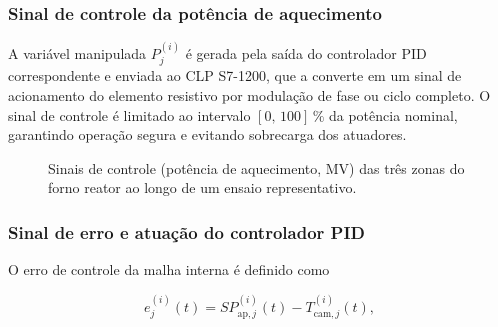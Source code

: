 \subsubsection{Sinal de controle da potência de aquecimento}
\label{sec:sinal_mv}

A variável manipulada $P^{(i)}_j$ é gerada pela saída do controlador PID
correspondente e enviada ao CLP S7-1200, que a converte em um sinal de
acionamento do elemento resistivo por modulação de fase ou ciclo completo.
O sinal de controle é limitado ao intervalo $[0,\,100]\,\%$ da potência
nominal, garantindo operação segura e evitando sobrecarga dos atuadores.


\begin{figure}[ht]
\begin{center}
\caption{Sinais de controle (potência de aquecimento, MV) das três zonas
do forno reator ao longo de um ensaio representativo.}
\label{fig:sinais_mv}
\end{center}
\end{figure}

\subsubsection{Sinal de erro e atuação do controlador PID}
\label{sec:sinal_erro}

O erro de controle da malha interna é definido como

\begin{equation}
  e^{(i)}_j(t) = SP^{(i)}_{\mathrm{ap},j}(t) - T^{(i)}_{\mathrm{cam},j}(t),
  \label{eq:erro_malha}
\end{equation}

